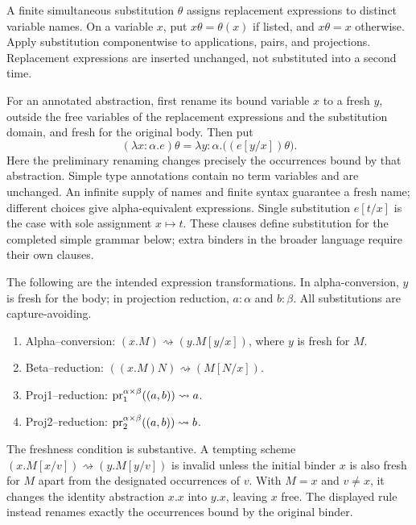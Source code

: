 \begin{definition}
A finite simultaneous substitution $\theta$ assigns replacement expressions
to distinct variable names. On a variable $x$, put $x\theta=\theta(x)$
if listed, and $x\theta=x$ otherwise. Apply substitution componentwise
to applications, pairs, and projections. Replacement expressions are
inserted unchanged, not substituted into a second time.

For an annotated abstraction, first rename its bound variable $x$ to a
fresh $y$, outside the free variables of the replacement expressions and
the substitution domain, and fresh for the original body. Then put
\[
(\lambda x:\alpha.e)\theta
 =\lambda y:\alpha.\bigl((e[y/x])\theta\bigr).
\]
Here the preliminary renaming changes precisely the occurrences bound by
that abstraction. Simple type annotations contain no term variables and
are unchanged. An infinite supply of names and finite syntax guarantee a
fresh name; different choices give alpha-equivalent expressions.
Single substitution $e[t/x]$ is the case with sole assignment $x\mapsto t$.
These clauses define substitution for the completed simple grammar below;
extra binders in the broader language require their own clauses.
\end{definition}


\begin{definition}[transformation]
The following are the intended expression transformations. In
alpha-conversion, $y$ is fresh for the body; in projection reduction,
$a:\alpha$ and $b:\beta$. All substitutions are
capture-avoiding.
\begin{enumerate}
\item Alpha--conversion: $(x.M) \rightsquigarrow (y.M[y/x])$, where $y$ is fresh for $M$.
\item Beta--reduction: $((x.M) N) \rightsquigarrow (M[N/x])$.
\item Proj1--reduction: $\mathrm{pr}_1^{\alpha\times\beta}((a,b)) \rightsquigarrow a$.
\item Proj2--reduction: $\mathrm{pr}_2^{\alpha\times\beta}((a,b)) \rightsquigarrow b$.
\end{enumerate}
\end{definition}
The freshness condition is substantive. A tempting scheme
$(x.M[x/v])\rightsquigarrow(y.M[y/v])$ is invalid unless the initial
binder $x$ is also fresh for $M$ apart from the designated occurrences
of $v$. With $M=x$ and $v\ne x$, it changes the identity abstraction
$x.x$ into $y.x$, leaving $x$ free. The displayed rule instead renames
exactly the occurrences bound by the original binder.

